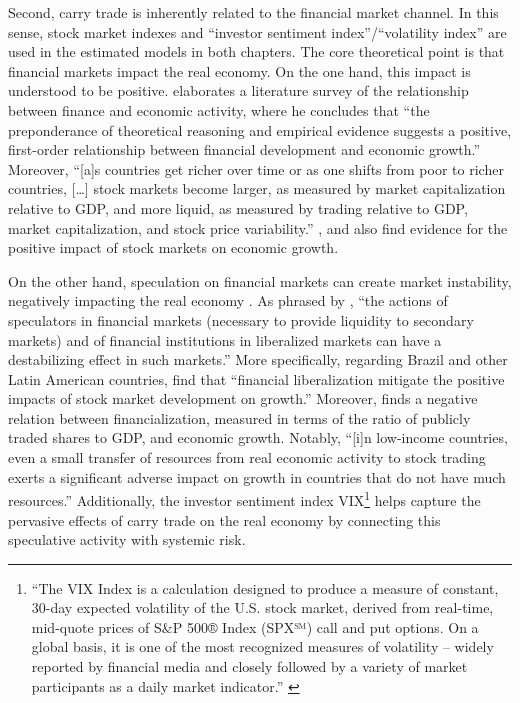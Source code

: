 \documentclass[a4paper, twoside]{templates/ociamthesis}
\begin{document}
Second, carry trade is inherently related to the financial market channel. In this sense, stock market indexes and ``investor sentiment index''/``volatility index'' \autocite{shaikh2017} are used in the estimated models in both chapters. The core theoretical point is that financial markets impact the real economy. On the one hand, this impact is understood to be positive. \textcite[ 688]{levine1997} elaborates a literature survey of the relationship between finance and economic activity, where he concludes that ``the preponderance of theoretical reasoning and empirical evidence suggests a positive, first-order relationship between financial development and economic growth.'' Moreover, ``{[}a{]}s countries get richer over time or as one shifts from poor to richer countries, {[}\ldots{]} stock markets become larger, as measured by market capitalization relative to GDP, and more liquid, as measured by trading relative to GDP, market capitalization, and stock price variability.'' \autocite[ 716-717]{levine1997} \textcite{levine1998}, \textcite{arestis2001} and \textcite{beck2004} also find evidence for the positive impact of stock markets on economic growth.

On the other hand, speculation on financial markets can create market instability, negatively impacting the real economy \autocite{depaula2013}. As phrased by \textcite[ 262]{hermann2014}, ``the actions of speculators in financial markets (necessary to provide liquidity to secondary markets) and of financial institutions in liberalized markets can have a destabilizing effect in such markets.'' More specifically, regarding Brazil and other Latin American countries, \textcite[ 1907]{shen2006} find that ``financial liberalization mitigate the positive impacts of stock market development on growth.'' Moreover, \textcite{moosa2018} finds a negative relation between financialization, measured in terms of the ratio of publicly traded shares to GDP, and economic growth. Notably, ``{[}i{]}n low-income countries, even a small transfer of resources from real economic activity to stock trading exerts a significant adverse impact on growth in countries that do not have much resources.'' \autocite[3412]{moosa2018} Additionally, the investor sentiment index VIX\footnote{``The VIX Index is a calculation designed to produce a measure of constant, 30-day expected volatility of the U.S. stock market, derived from real-time, mid-quote prices of S\&P 500® Index (SPX℠) call and put options. On a global basis, it is one of the most recognized measures of volatility -- widely reported by financial media and closely followed by a variety of market participants as a daily market indicator.'' \autocite{cboeexchange2021}} helps capture the pervasive effects of carry trade on the real economy by connecting this speculative activity with systemic risk.
\end{document}
